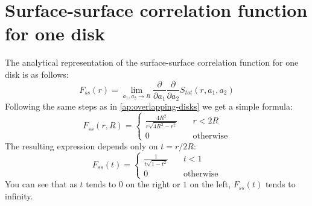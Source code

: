 \documentclass[reprint,amsmath,amssymb,aps,pre]{revtex4-1}
\begin{document}
\appendix
\section{Surface-surface correlation function for one disk}
The analytical representation of the surface-surface correlation function for
one disk is as follows:
\begin{equation*}
  F_{ss}(r) = \lim_{a_1, a_2 \rightarrow R} \frac{\partial}{\partial a_1}
  \frac{\partial}{\partial a_2} S_{tot}(r, a_1, a_2)
\end{equation*}
Following the same steps as in \cref{ap:overlapping-disks} we get a simple
formula:
\begin{equation*}
  F_{ss}(r,R) = \left\{
  \begin{array}{ll}
    \frac{4R^2}{r\sqrt{4R^2-r^2}} & \quad r < 2R \\
    0 & \quad \text{otherwise}
  \end{array} \right.
\end{equation*}
The resulting expression depends only on $t = r / 2R$:
\begin{equation*}
  F_{ss}(t) = \left\{
  \begin{array}{ll}
    \frac{1}{t\sqrt{1-t^2}} & \quad t < 1 \\
    0 & \quad \text{otherwise}
  \end{array} \right.
\end{equation*}
You can see that as $t$ tends to $0$ on the right or $1$ on the left,
$F_{ss}(t)$ tends to infinity.

\onecolumngrid


\twocolumngrid
\end{document}
